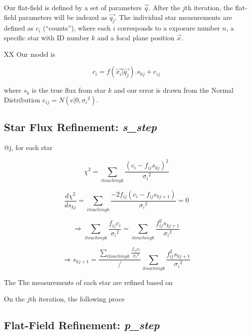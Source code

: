 \documentclass[12pt,a4paper,twoside]{article}
\begin{document}
Our flat-field is defined by a set of parameters $\vec{q}$. After the $j$th iteration, the flat-field parameters will be indexed as $\vec{q_j}$. The individual star measurements are defined as $c_i$ (``counts''), where each $i$ corresponds to a exposure number $n$, a specific star with ID number $k$ and a focal plane position $\vec{x}$.

XX Our model is

\begin{equation}
c_i = f(\vec{x_i} | \vec{q_j}) . s_{kj} + e_{ij}
\end{equation}

where $s_k$ is the true flux from star $k$ and our error is drawn from the Normal Distribution $e_{ij} = N(e|0,{\sigma_i}^2)$.

\subsection{Star Flux Refinement: \textbf{\textit{s\_step}}}
@j, for each star

\begin{equation}
\chi^2 = \sum_{i touching k} \frac{(c_i-f_{ij}s_{kj})^2}{{\sigma_i}^2}
\end{equation}

\begin{equation}
\frac{d\chi^2}{d s_{kj}} = \sum_{i touching k} \frac{-2 f_{ij} (c_i-f_{ij}s_{kj+1})}{{\sigma_i}^2} = 0
\end{equation}

\begin{equation}
\Rightarrow \sum_{i touching k} \frac{f_{ij} c_i}{{\sigma_i}^2}= \sum_{i touching k} \frac{f_{ij}^2 s_{kj+1}}{{\sigma_i}^2}
\end{equation}

\begin{equation}
\Rightarrow s_{kj+1} = \frac{\sum_{i touching k} \frac{f_{ij} c_i}{{\sigma_i}^2}}/{\sum_{i touching k} \frac{f_{ij}^2 s_{kj+1}}{{\sigma_i}^2}}
\end{equation}



The 
The measurements of each star are refined based on 


On the $j$th iteration, the following proce

\subsection{Flat-Field Refinement: \textbf{\textit{p\_step}}}
\end{document}

